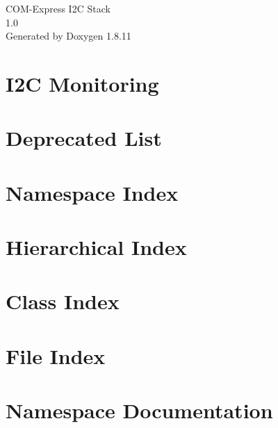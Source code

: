 \documentclass[twoside]{book}
\newcommand{\+}{\discretionary{\mbox{\scriptsize$\hookleftarrow$}}{}{}}
\newcommand{\clearemptydoublepage}{%
  \newpage{\pagestyle{empty}\cleardoublepage}%
}
\begin{document}
\hypersetup{pageanchor=false,
             bookmarksnumbered=true,
             pdfencoding=unicode
            }
\begin{titlepage}
\vspace*{7cm}
\begin{center}%
{\Large C\+O\+M-\/\+Express I2C Stack \\[1ex]\large 1.\+0 }\\
\vspace*{1cm}
{\large Generated by Doxygen 1.8.11}\\
\end{center}
\end{titlepage}
\clearemptydoublepage
\tableofcontents
\clearemptydoublepage
{}
\hypersetup{pageanchor=true}

\chapter{I2C Monitoring}
\label{md_README}
\hypertarget{md_README}{}

\chapter{Deprecated List}
\label{deprecated}
\hypertarget{deprecated}{}

\chapter{Namespace Index}

\chapter{Hierarchical Index}

\chapter{Class Index}

\chapter{File Index}

\chapter{Namespace Documentation}




















\end{document}
